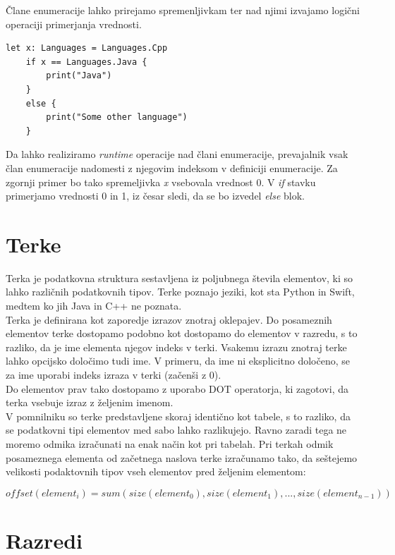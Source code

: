 \documentclass[a4paper, 12p]{book}
\begin{document}
Člane enumeracije lahko prirejamo spremenljivkam ter nad njimi izvajamo logični operaciji primerjanja vrednosti. 

\begin{lstlisting}[caption={}, captionpos=b]
	let x: Languages = Languages.Cpp
	if x == Languages.Java {
	    print("Java")
	}
	else {
	    print("Some other language")
	}
\end{lstlisting}

Da lahko realiziramo \textit{runtime} operacije nad člani enumeracije, prevajalnik vsak član enumeracije nadomesti z njegovim indeksom v definiciji enumeracije. Za zgornji primer bo tako spremeljivka \textit{x} vsebovala vrednost 0. V \textit{if} stavku primerjamo vrednosti 0 in 1, iz česar sledi, da se bo izvedel \textit{else} blok.

\newpage
\section{Terke}

Terka je podatkovna struktura sestavljena iz poljubnega števila elementov, ki so lahko različnih podatkovnih tipov. Terke poznajo jeziki, kot sta Python in Swift, medtem ko jih Java in C++ ne poznata.\\
\indent Terka je definirana kot zaporedje izrazov znotraj oklepajev. Do posameznih elementov terke dostopamo podobno kot dostopamo do elementov v razredu, s to razliko, da je ime elementa njegov indeks v terki. Vsakemu izrazu znotraj terke lahko opcijsko določimo tudi ime. V primeru, da ime ni eksplicitno določeno, se za ime uporabi indeks izraza v terki (začenši z 0). \\
\indent Do elementov prav tako dostopamo z uporabo DOT operatorja, ki zagotovi, da terka vsebuje izraz z željenim imenom.\\
\indent V pomnilniku so terke predstavljene skoraj identično kot tabele, s to razliko, da se podatkovni tipi elementov med sabo lahko razlikujejo. Ravno zaradi tega ne moremo odmika izračunati na enak način kot pri tabelah. Pri terkah odmik posameznega elementa od začetnega naslova terke izračunamo tako, da seštejemo velikosti podaktovnih tipov vseh elementov pred željenim elementom:

\vspace{-7mm}
\[ offset ( element_i )  = sum ( size ( element_0 ), size( element_1 ), ..., size ( element_{n-1})) \]

\section{Razredi}
\end{document}
